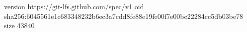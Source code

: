 version https://git-lfs.github.com/spec/v1
oid sha256:6045561e1e683348232b6ec3a7cdd8fe88e19fe00f7e00bc22284cc5db03be78
size 43840
